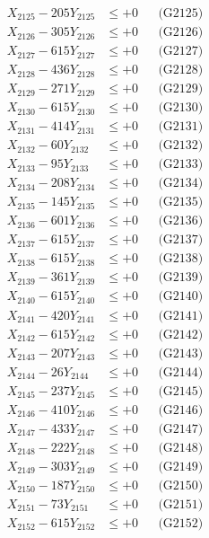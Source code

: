 \documentclass[a4paper,10pt]{article}
\begin{document}
{\begin{align}
X_{2125} - 205Y_{2125} &\leq +0 && \text{(G2125)} \\
X_{2126} - 305Y_{2126} &\leq +0 && \text{(G2126)} \\
X_{2127} - 615Y_{2127} &\leq +0 && \text{(G2127)} \\
X_{2128} - 436Y_{2128} &\leq +0 && \text{(G2128)} \\
X_{2129} - 271Y_{2129} &\leq +0 && \text{(G2129)} \\
X_{2130} - 615Y_{2130} &\leq +0 && \text{(G2130)} \\
\allowbreak
X_{2131} - 414Y_{2131} &\leq +0 && \text{(G2131)} \\
X_{2132} - 60Y_{2132} &\leq +0 && \text{(G2132)} \\
X_{2133} - 95Y_{2133} &\leq +0 && \text{(G2133)} \\
X_{2134} - 208Y_{2134} &\leq +0 && \text{(G2134)} \\
X_{2135} - 145Y_{2135} &\leq +0 && \text{(G2135)} \\
X_{2136} - 601Y_{2136} &\leq +0 && \text{(G2136)} \\
X_{2137} - 615Y_{2137} &\leq +0 && \text{(G2137)} \\
X_{2138} - 615Y_{2138} &\leq +0 && \text{(G2138)} \\
X_{2139} - 361Y_{2139} &\leq +0 && \text{(G2139)} \\
X_{2140} - 615Y_{2140} &\leq +0 && \text{(G2140)} \\
\allowbreak
X_{2141} - 420Y_{2141} &\leq +0 && \text{(G2141)} \\
X_{2142} - 615Y_{2142} &\leq +0 && \text{(G2142)} \\
X_{2143} - 207Y_{2143} &\leq +0 && \text{(G2143)} \\
X_{2144} - 26Y_{2144} &\leq +0 && \text{(G2144)} \\
X_{2145} - 237Y_{2145} &\leq +0 && \text{(G2145)} \\
X_{2146} - 410Y_{2146} &\leq +0 && \text{(G2146)} \\
X_{2147} - 433Y_{2147} &\leq +0 && \text{(G2147)} \\
X_{2148} - 222Y_{2148} &\leq +0 && \text{(G2148)} \\
X_{2149} - 303Y_{2149} &\leq +0 && \text{(G2149)} \\
X_{2150} - 187Y_{2150} &\leq +0 && \text{(G2150)} \\
\allowbreak
X_{2151} - 73Y_{2151} &\leq +0 && \text{(G2151)} \\
X_{2152} - 615Y_{2152} &\leq +0 && \text{(G2152)} \\

\end{align}}
\end{document}
